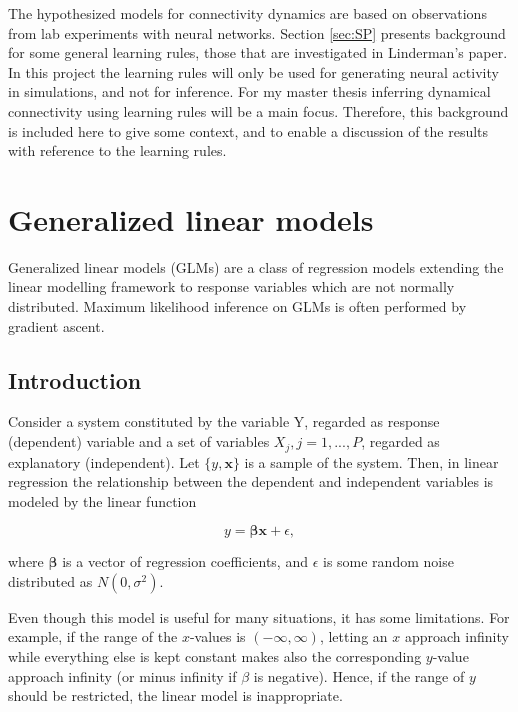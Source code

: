 The hypothesized models for connectivity dynamics are based on observations from lab experiments with neural networks. Section \ref{sec:SP} presents background for some general learning rules, those that are investigated in Linderman's paper. In this project the learning rules will only be used for generating neural activity in simulations, and not for inference. For my master thesis inferring dynamical connectivity using learning rules will be a main focus. Therefore, this background is included here to give some context, and to enable a discussion of the results with reference to the learning rules.

\section{Generalized linear models}
\label{sec:stats}

Generalized linear models (GLMs) are a class of regression models extending the linear modelling framework to response variables which are not normally distributed. Maximum likelihood inference on GLMs is often performed by gradient ascent.

\subsection{Introduction}
\label{Intro_GLM}
Consider a system constituted by the variable Y, regarded as response (dependent) variable and a set of variables ${X_j}, {j=1,...,P}$, regarded as explanatory (independent). Let $\{y,\mathbf{x}\}$ is a sample of the system. Then, in linear regression the relationship between the dependent and independent variables is modeled by the linear function

\begin{equation}
\label{eq:general}
    y = \bm{ \beta} \mathbf{x} + \epsilon,
\end{equation}

where $\bm{\beta}$ is a vector of regression coefficients, and $\epsilon$ is some random noise distributed as $N(0, \sigma^{2})$. 

Even though this model is useful for many situations, it has some limitations. For example, if the range of the $x$-values is $(-\infty, \infty)$, letting an $x$ approach infinity while everything else is kept constant makes also the corresponding $y$-value approach infinity (or minus infinity if $\beta$ is negative). Hence, if the range of $y$ should be restricted, the linear model is inappropriate. 

